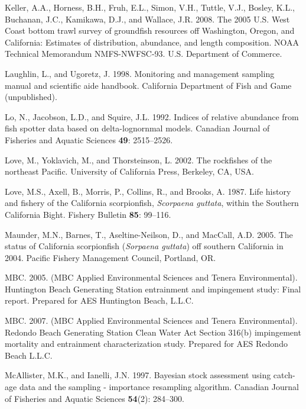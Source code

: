\documentclass[12pt,]{article}
\begin{document}
\hypertarget{ref-Keller2008}{}
Keller, A.A., Horness, B.H., Fruh, E.L., Simon, V.H., Tuttle, V.J.,
Bosley, K.L., Buchanan, J.C., Kamikawa, D.J., and Wallace, J.R. 2008.
The 2005 U.S. West Coast bottom trawl survey of groundfish resources off
Washington, Oregon, and California: Estimates of distribution,
abundance, and length composition. NOAA Technical Memorandum
NMFS-NWFSC-93. U.S. Department of Commerce.

\hypertarget{ref-Laughlin1998}{}
Laughlin, L., and Ugoretz, J. 1998. Monitoring and management sampling
manual and scientific aide handbook. California Department of Fish and
Game (unpublished).

\hypertarget{ref-Lo1992}{}
Lo, N., Jacobson, L.D., and Squire, J.L. 1992. Indices of relative
abundance from fish spotter data based on delta-lognornmal models.
Canadian Journal of Fisheries and Aquatic Sciences \textbf{49}:
2515--2526.

\hypertarget{ref-Love2002}{}
Love, M., Yoklavich, M., and Thorsteinson, L. 2002. The rockfishes of
the northeast Pacific. University of California Press, Berkeley, CA,
USA.

\hypertarget{ref-Love1987}{}
Love, M.S., Axell, B., Morris, P., Collins, R., and Brooks, A. 1987.
Life history and fishery of the California scorpionfish, \emph{Scorpaena
guttata}, within the Southern California Bight. Fishery Bulletin
\textbf{85}: 99--116.

\hypertarget{ref-Maunder2005}{}
Maunder, M.N., Barnes, T., Aseltine-Neilson, D., and MacCall, A.D. 2005.
The status of California scorpionfish (\emph{Sorpaena guttata}) off
southern California in 2004. Pacific Fishery Management Council,
Portland, OR.

\hypertarget{ref-MBC2005}{}
MBC. 2005. (MBC Applied Environmental Sciences and Tenera
Environmental). Huntington Beach Generating Station entrainment and
impingement study: Final report. Prepared for AES Huntington Beach,
L.L.C.

\hypertarget{ref-MBC2007}{}
MBC. 2007. (MBC Applied Environmental Sciences and Tenera
Environmental). Redondo Beach Generating Station Clean Water Act Section
316(b) impingement mortality and entrainment characterization study.
Prepared for AES Redondo Beach L.L.C.

\hypertarget{ref-McAllister1997}{}
McAllister, M.K., and Ianelli, J.N. 1997. Bayesian stock assessment
using catch-age data and the sampling - importance resampling algorithm.
Canadian Journal of Fisheries and Aquatic Sciences \textbf{54}(2):
284--300.
\end{document}
